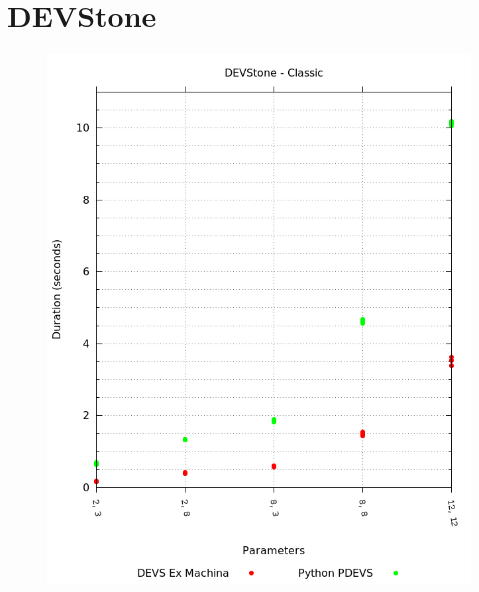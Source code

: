 \documentclass[8pt,a4paper]{report}
\begin{document}
\section{DEVStone}
\begin{figure}
\centering
\begin{minipage}{.5\textwidth}
  \centering
  \hspace*{-1.5in}
  \includegraphics[width=1.6\linewidth]{devstone_classic.png}
\end{minipage}%
\begin{minipage}{.5\textwidth}
  \centering

\end{minipage}
\end{figure}
\end{document}
